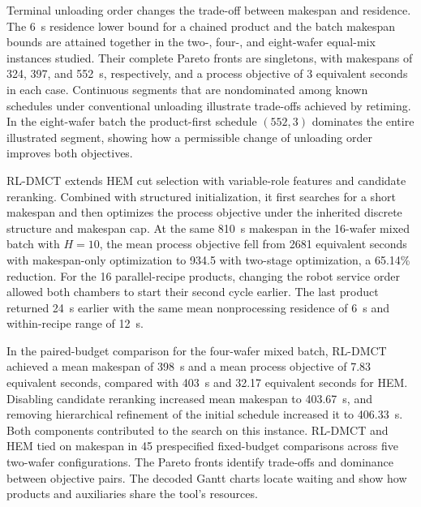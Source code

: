 Terminal unloading order changes the trade-off between makespan and residence. The 6~s residence lower bound for a chained product and the batch makespan bounds are attained together in the two-, four-, and eight-wafer equal-mix instances studied. Their complete Pareto fronts are singletons, with makespans of 324, 397, and 552~s, respectively, and a process objective of 3 equivalent seconds in each case. Continuous segments that are nondominated among known schedules under conventional unloading illustrate trade-offs achieved by retiming. In the eight-wafer batch the product-first schedule $(552,3)$ dominates the entire illustrated segment, showing how a permissible change of unloading order improves both objectives.

RL-DMCT extends HEM cut selection with variable-role features and candidate reranking. Combined with structured initialization, it first searches for a short makespan and then optimizes the process objective under the inherited discrete structure and makespan cap. At the same 810~s makespan in the 16-wafer mixed batch with $H=10$, the mean process objective fell from 2681 equivalent seconds with makespan-only optimization to 934.5 with two-stage optimization, a 65.14\% reduction. For the 16 parallel-recipe products, changing the robot service order allowed both chambers to start their second cycle earlier. The last product returned 24~s earlier with the same mean nonprocessing residence of 6~s and within-recipe range of 12~s.

In the paired-budget comparison for the four-wafer mixed batch, RL-DMCT achieved a mean makespan of 398~s and a mean process objective of 7.83 equivalent seconds, compared with 403~s and 32.17 equivalent seconds for HEM. Disabling candidate reranking increased mean makespan to 403.67~s, and removing hierarchical refinement of the initial schedule increased it to 406.33~s. Both components contributed to the search on this instance. RL-DMCT and HEM tied on makespan in 45 prespecified fixed-budget comparisons across five two-wafer configurations. The Pareto fronts identify trade-offs and dominance between objective pairs. The decoded Gantt charts locate waiting and show how products and auxiliaries share the tool's resources.
